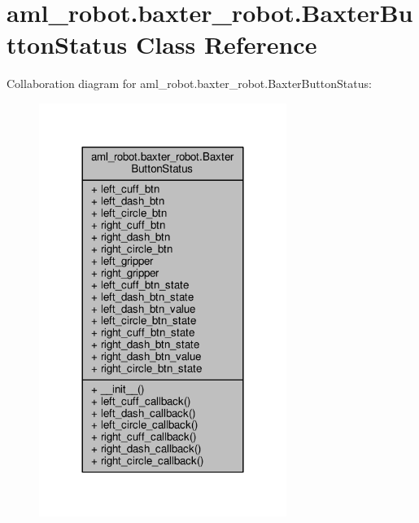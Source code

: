 \hypertarget{classaml__robot_1_1baxter__robot_1_1_baxter_button_status}{\section{aml\-\_\-robot.\-baxter\-\_\-robot.\-Baxter\-Button\-Status Class Reference}
\label{classaml__robot_1_1baxter__robot_1_1_baxter_button_status}
}


Collaboration diagram for aml\-\_\-robot.\-baxter\-\_\-robot.\-Baxter\-Button\-Status\-:
\nopagebreak
\begin{figure}[H]
\begin{center}
\leavevmode
\includegraphics[width=228pt]{classaml__robot_1_1baxter__robot_1_1_baxter_button_status__coll__graph}
\end{center}
\end{figure}
